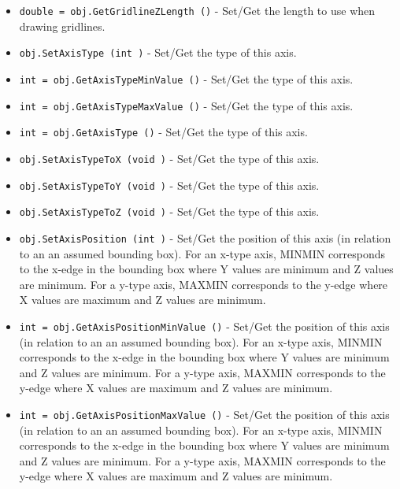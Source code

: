 \begin{itemize}
\item  \verb|double = obj.GetGridlineZLength ()| -  Set/Get the length to use when drawing gridlines. 

\item  \verb|obj.SetAxisType (int )| -  Set/Get the type of this axis.

\item  \verb|int = obj.GetAxisTypeMinValue ()| -  Set/Get the type of this axis.

\item  \verb|int = obj.GetAxisTypeMaxValue ()| -  Set/Get the type of this axis.

\item  \verb|int = obj.GetAxisType ()| -  Set/Get the type of this axis.

\item  \verb|obj.SetAxisTypeToX (void )| -  Set/Get the type of this axis.

\item  \verb|obj.SetAxisTypeToY (void )| -  Set/Get the type of this axis.

\item  \verb|obj.SetAxisTypeToZ (void )| -  Set/Get the type of this axis.

\item  \verb|obj.SetAxisPosition (int )| -  Set/Get the position of this axis (in relation to an an
 assumed bounding box).  For an x-type axis, MINMIN corresponds
 to the x-edge in the bounding box where Y values are minimum and 
 Z values are minimum. For a y-type axis, MAXMIN corresponds to the 
 y-edge where X values are maximum and Z values are minimum.
 

\item  \verb|int = obj.GetAxisPositionMinValue ()| -  Set/Get the position of this axis (in relation to an an
 assumed bounding box).  For an x-type axis, MINMIN corresponds
 to the x-edge in the bounding box where Y values are minimum and 
 Z values are minimum. For a y-type axis, MAXMIN corresponds to the 
 y-edge where X values are maximum and Z values are minimum.
 

\item  \verb|int = obj.GetAxisPositionMaxValue ()| -  Set/Get the position of this axis (in relation to an an
 assumed bounding box).  For an x-type axis, MINMIN corresponds
 to the x-edge in the bounding box where Y values are minimum and 
 Z values are minimum. For a y-type axis, MAXMIN corresponds to the 
 y-edge where X values are maximum and Z values are minimum.
 


\end{itemize}

